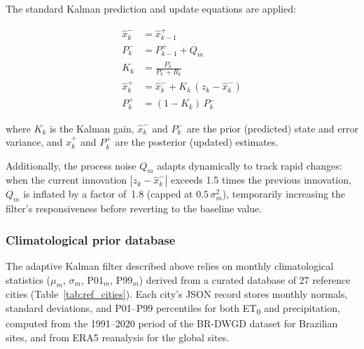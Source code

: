 \documentclass[preprint,review,12pt]{elsarticle}
\begin{document}
The standard Kalman prediction and update equations are applied:

\begin{align}
\hat{x}_k^{-} &= \hat{x}_{k-1}^{+} \label{eq:kalman_predict_x}\\
P_k^{-} &= P_{k-1}^{+} + Q_m \label{eq:kalman_predict_P}\\
K_k &= \frac{P_k^{-}}{P_k^{-} + R_k} \label{eq:kalman_gain}\\
\hat{x}_k^{+} &= \hat{x}_k^{-} + K_k\,(z_k - \hat{x}_k^{-}) \label{eq:kalman_update_x}\\
P_k^{+} &= (1 - K_k)\,P_k^{-} \label{eq:kalman_update_P}
\end{align}

\noindent where $K_k$ is the Kalman gain, $\hat{x}_k^{-}$ and $P_k^{-}$ are
the prior (predicted) state and error variance, and $\hat{x}_k^{+}$ and
$P_k^{+}$ are the posterior (updated) estimates.

Additionally, the process noise $Q_m$ adapts dynamically to track rapid
changes: when the current innovation $|z_k - \hat{x}_k^{-}|$ exceeds 1.5
times the previous innovation, $Q_m$ is inflated by a factor of~1.8 (capped at
$0.5\,\sigma_m^2$), temporarily increasing the filter's responsiveness before
reverting to the baseline value.

\subsubsection*{Climatological prior database}

The adaptive Kalman filter described above relies on monthly climatological
statistics ($\mu_m$, $\sigma_m$, P01$_m$, P99$_m$) derived from a curated
database of 27 reference cities (Table~\ref{tab:ref_cities}). Each city's JSON
record stores monthly normals, standard deviations, and P01--P99 percentiles
for both ET\textsubscript{0} and precipitation, computed from the 1991--2020
period of the BR-DWGD dataset \citep{Xavier2016, Xavier2022} for Brazilian
sites, and from ERA5 reanalysis for the global sites.
\end{document}
